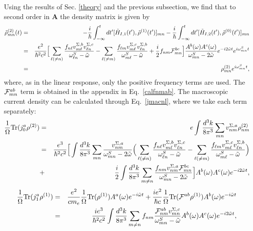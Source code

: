 \documentclass[floatfix,prb,aps,superscriptaddress,11pt]{revtex4}
\begin{document}
Using the results of Sec. \ref{theory} and the previous subsection, we find
that to second order in $\mathbf{A}$ the density matrix is given by 
\begin{eqnarray*}
\tilde{{\rho}}_{mn}^{(2)}(t) &=&-\frac{i}{\hbar }\int_{-\infty }^{t}dt^{\prime
}[\tilde{H}_{I,1}(t^{\prime }),\tilde{{\rho}}^{(1)}(t^{\prime })]_{mn}-\frac{i}{
\hbar }\int_{-\infty }^{t}dt^{\prime }[\tilde{H}_{I,2}(t^{\prime }),\tilde{
{\rho}}^{(0)}(t^{\prime })]_{mn}  \notag  \label{rho2nl} \\
&=&\frac{e^{2}}{\hbar ^{2}c^{2}}
\Big
[
\sum_{\ell(\neq n)}
\frac{f_{n\ell}v_{m\ell}^{\Sigma
,b}v_{\ell n}^{\Sigma ,c}}{\omega_{\ell n}^{S}-\tilde\omega}
-
\sum_{\ell(\neq m)}
\frac{f_{\ell m}v_{m\ell}^{\Sigma
,c}v_{\ell n}^{\Sigma ,b}}{\omega_{m\ell}^{S}-\tilde\omega}
+\frac{i}{2}f_{nm}\mathcal{F}
_{mn}^{bc}
\Big]\frac{A^{b}(\omega)A^{c}(\omega)}{\omega_{mn}^{S}-2\tilde\omega}
e^{-i2\tilde{\omega}t} 
e^{i\omega_{mn}^{S}t}
\notag \\
&=&{\rho}_{mn}^{(2)}
e^{i\omega_{mn}^{S}t}
, 
\end{eqnarray*}
where, as in the linear response, only the positive frequency terms
are used.
The ${\cal F}^{ab}_{mn}$ term is obtained in the appendix in Eq.~\eqref{calfnmab}.
The macroscopic current density can be calculated through
Eq.~\eqref{jmacnl},
 where we take each term separately: 
\begin{eqnarray}
\frac{1}{\Omega}\mbox{Tr}(j_{0}^{a}{\rho}^{(2)}) &=&e\int \frac{d^{3}k}{8\pi ^{3}}
\sum_{mn}v_{nm}^{\Sigma ,a}{\rho}_{nm}^{(2)}  \notag  \label{tr1} \\
&=&\frac{e^{3}}{\hbar ^{2}c^{2}}\Big[\int \frac{d^{3}k}{8\pi ^{3}}\sum_{mn}
\frac{v_{nm}^{\Sigma ,a}}{\omega_{mn}^{S}-2\tilde\omega}
\Big(
\sum_{\ell(\neq n)}
\frac{f_{n\ell}v_{m\ell}^{\Sigma
,b}v_{\ell n}^{\Sigma ,c}}{\omega_{\ell n}^{S}-\tilde\omega}
-
\sum_{\ell(\neq m)}
\frac{f_{\ell m}v_{m\ell}^{\Sigma
,c}v_{\ell n}^{\Sigma ,b}}{\omega_{m\ell}^{S}-\tilde\omega}
\Big)
\nonumber\\
&+&\frac{i}{2}\int \frac{d^{3}k}{8\pi ^{3}}\sum_{m\ne n}\frac{
f_{nm}v_{nm}^{\Sigma ,a}\mathcal{F}_{mn}^{bc}}{\omega_{mn}^{S}-2\tilde\omega}\Big]
A^{b}(\omega)A^{c}(\omega) 
e^{-i2\tilde{\omega} t}
,
\end{eqnarray}
\begin{eqnarray}
\frac{1}{\Omega}\mbox{Tr}(j_{1}^{a}{\rho}^{(1)}) &=&\frac{e^{2}}{cm_e}\frac{1}{\Omega}
\mbox{Tr}({\rho}^{(1)}) A^{a}(\omega)e^{-i\tilde{\omega} t}
+\frac{ie^{2}}{\hbar c}\frac{1}{\Omega}\mbox{Tr}(
\mathcal{F}^{ab}{\rho}^{(1)})
A^{b}(\omega) e^{-i\tilde{\omega} t}
\notag  \label{tr2} \\
&=&\frac{ie^{3}}{\hbar ^{2}c^{2}}
\int \frac{d^{3}k}{8\pi^3}
\sum_{m\ne n}f_{nm}
\frac{\mathcal{F}_{nm}^{ab}v_{mn}^{\Sigma ,c}}{\omega_{mn}^{S}-\tilde\omega}
A^{b}(\omega)A^{c}(\omega)
e^{-i2\tilde{\omega} t}
,
\end{eqnarray}
\end{document}
